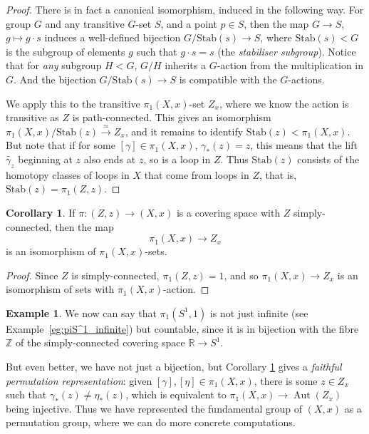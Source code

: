 \documentclass{tufte-handout}
\def\RR{\mathbb{R}}
\def\ZZ{\mathbb{Z}}
\DeclareMathOperator{\Aut}{Aut}
\theoremstyle{definition}
\newtheorem{example}{Example}
\newtheorem{corollary}{Corollary}
\begin{document}
\begin{proof}

There  is in fact a canonical isomorphism, induced in the following way. For 
group $G$ and any transitive $G$-set $S$, and a point $p\in S$, then the map $G \to S$, 
$g\mapsto g\cdot s$ induces a well-defined bijection $G/\mathrm{Stab}(s) \to S$, where 
$\mathrm{Stab}(s) < G$ is the subgroup of elements $g$ such that $g\cdot s = s$ (the 
\emph{stabiliser subgroup}). Notice that for \emph{any} subgroup $H< G$, $G/H$ inherits 
a $G$-action from the multiplication in $G$. And the bijection $G/\mathrm{Stab}(s) \to S$ is 
compatible with the $G$-actions.

We apply this to the transitive $\pi_1(X,x)$-set $Z_x$, where we know the action is 
transitive as $Z$ is path-connected. This gives an isomorphism 
$\pi_1(X,x)/\mathrm{Stab}(z) \xrightarrow{\simeq} Z_x$, and it remains to identify 
$\mathrm{Stab}(z) < \pi_1(X,x)$. But note that if for some $[\gamma] \in \pi_1(X,x)$, 
$\gamma_*(z)=z$, this means that the lift $\widetilde{\gamma_z}$ beginning at $z$ also 
ends at $z$, so is a loop in $Z$. Thus $\mathrm{Stab}(z)$ consists of the homotopy 
classes of loops in $X$ that come from loops in $Z$, that is, $\mathrm{Stab}(z) = 
\pi_1(Z,z)$.
\end{proof}




\begin{corollary}\label{cor:fibre_of_univ_cov_space}
If $\pi\colon (Z,z) \to (X,x)$ is a covering space with $Z$ simply-connected, then the map
\[
\pi_1(X,x) \to Z_x
\]
is an isomorphism of $\pi_1(X,x)$-sets.
\end{corollary}


\begin{proof}
Since $Z$ is simply-connected, $\pi_1(Z,z) = 1$, and so $\pi_1(X,x) \to Z_x$ is an isomorphism
of sets with $\pi_1(X,x)$-action.
\end{proof}

\begin{example}
We now can say that $\pi_1(S^1,1)$ is not just infinite (see Example~\ref{eg:piS^1_infinite})
 but countable, since it is in bijection with the fibre $\ZZ$ of the simply-connected covering space $\RR \to S^1$.
\end{example}

But even better, we have not just a bijection, but Corollary 
\ref{cor:fibre_of_univ_cov_space} gives a \emph{faithful permutation representation}: 
given $[\gamma],[\eta]\in \pi_1(X,x)$, there is some $z\in Z_x$ such that 
$\gamma_*(z)\neq \eta_*(z)$, which is equivalent to $\pi_1(X,x) \to \Aut(Z_x)$ being 
injective. Thus we have represented the fundamental group of $(X,x)$ as a permutation 
group, where we can do more concrete computations.
\end{document}
